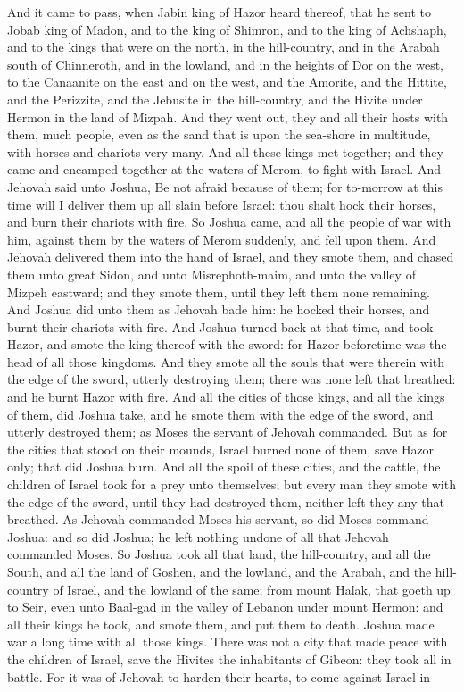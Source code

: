 And it came to pass, when Jabin king of Hazor heard thereof, that he sent to Jobab king of Madon, and to the king of Shimron, and to the king of Achshaph, and to the kings that were on the north, in the hill-country, and in the Arabah south of Chinneroth, and in the lowland, and in the heights of Dor on the west, to the Canaanite on the east and on the west, and the Amorite, and the Hittite, and the Perizzite, and the Jebusite in the hill-country, and the Hivite under Hermon in the land of Mizpah. And they went out, they and all their hosts with them, much people, even as the sand that is upon the sea-shore in multitude, with horses and chariots very many. And all these kings met together; and they came and encamped together at the waters of Merom, to fight with Israel.  And Jehovah said unto Joshua, Be not afraid because of them; for to-morrow at this time will I deliver them up all slain before Israel: thou shalt hock their horses, and burn their chariots with fire. So Joshua came, and all the people of war with him, against them by the waters of Merom suddenly, and fell upon them. And Jehovah delivered them into the hand of Israel, and they smote them, and chased them unto great Sidon, and unto Misrephoth-maim, and unto the valley of Mizpeh eastward; and they smote them, until they left them none remaining. And Joshua did unto them as Jehovah bade him: he hocked their horses, and burnt their chariots with fire.  And Joshua turned back at that time, and took Hazor, and smote the king thereof with the sword: for Hazor beforetime was the head of all those kingdoms. And they smote all the souls that were therein with the edge of the sword, utterly destroying them; there was none left that breathed: and he burnt Hazor with fire. And all the cities of those kings, and all the kings of them, did Joshua take, and he smote them with the edge of the sword, and utterly destroyed them; as Moses the servant of Jehovah commanded. But as for the cities that stood on their mounds, Israel burned none of them, save Hazor only; that did Joshua burn. And all the spoil of these cities, and the cattle, the children of Israel took for a prey unto themselves; but every man they smote with the edge of the sword, until they had destroyed them, neither left they any that breathed. As Jehovah commanded Moses his servant, so did Moses command Joshua: and so did Joshua; he left nothing undone of all that Jehovah commanded Moses.  So Joshua took all that land, the hill-country, and all the South, and all the land of Goshen, and the lowland, and the Arabah, and the hill-country of Israel, and the lowland of the same; from mount Halak, that goeth up to Seir, even unto Baal-gad in the valley of Lebanon under mount Hermon: and all their kings he took, and smote them, and put them to death. Joshua made war a long time with all those kings. There was not a city that made peace with the children of Israel, save the Hivites the inhabitants of Gibeon: they took all in battle. For it was of Jehovah to harden their hearts, to come against Israel in 